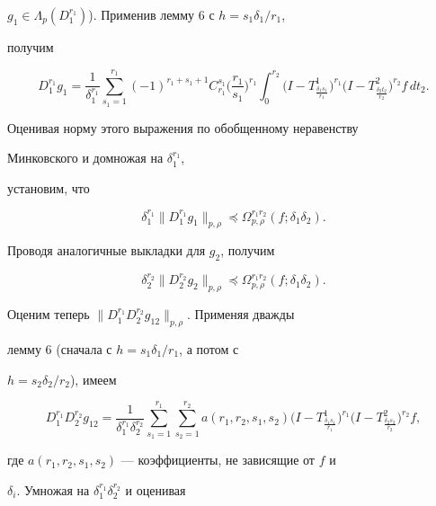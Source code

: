 $g_1\in\Lambda_p(D^{r_1}_1)$). Применив лемму 6 с $h=s_1\delta_1/r_1$, 


получим 


$$ 


D^{r_1}_1g_1=\frac{1}{\delta^{r_1}_1}\sum^{r_1}_{s_1=1} 


(-1)^{r_1+s_1+1}C^{s_1}_{r_1}\bigg(\frac{r_1}{s_1} \bigg)^{r_1}


\int^{r_2}_0\big(I-T^1_{\frac{\delta_1s_1}{r_1}}\big)^{r_1} 


\big(I-T^2_{\frac{\delta_2t_2}{r_2}}\big)^{r_2}f\,dt_2. 


$$ 


Оценивая норму этого выражения по обобщенному неравенству 


Минковского и домножая на $\delta^{r_1}_1$, 


установим, что 


$$ 


\delta^{r_1}_1\|D^{r_1}_1g_1\|_{p,\rho}\preceq 


\Omega^{r_1r_2}_{p,\rho}(f;\delta_1\delta_2). 


$$ 


Проводя аналогичные выкладки для $g_2$, получим 


$$ 


\delta^{r_2}_2\|D^{r_2}_2g_2\|_{p,\rho}\preceq 


\Omega^{r_1r_2}_{p,\rho}(f;\delta_1\delta_2). 


$$ 


 


Оценим теперь $\|D^{r_1}_1D^{r_2}_2g_{12}\|_{p,\rho}$. Применяя дважды 


лемму 6 (сначала с $h=s_1\delta_1/r_1$, а потом с 


$h=s_2\delta_2/r_2$), имеем 


$$ 


D^{r_1}_1D^{r_2}_2g_{12}=\frac{1}{\delta^{r_1}_1\delta^{r_2}_2} 


\sum^{r_1}_{s_1=1}\sum^{r_2}_{s_2=1} 


a(r_1,r_2,s_1,s_2)\big(I-T^1_{\frac{\delta_1s_1}{r_1}}\big)^{r_1} 


\big(I-T^2_{\frac{\delta_2s_2}{r_2}}\big)^{r_2}f, 


$$ 


где $a(r_1,r_2,s_1,s_2)$ --- коэффициенты, не зависящие от $f$ и 


$\delta_i$. Умножая на $\delta^{r_1}_1\delta^{r_2}_2$ и оценивая 



